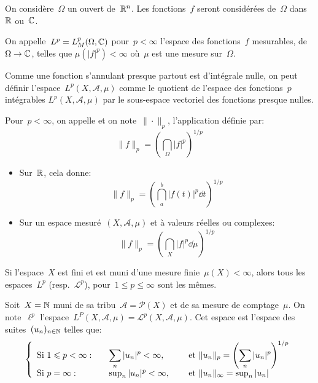 On considère~$\Omega$ un ouvert de~$\mathbb R^n$.
Les fonctions~$f$ seront considérées de~$\Omega$ dans~$\mathbb R$ ou~$\mathbb C$.

\medskip
On appelle~$\colorblue L^p \colorblack= L^p_M(\Omega,\CC)$ pour~$p<\infty$ l'espace des fonctions~$f$ mesurables, de~$\Omega \rightarrow \mathbb C$, telles que $\mu(|f|^p)<\infty$ où~$\mu$ est une mesure sur~$\Omega$.

\medskip
Comme une fonction s'annulant presque partout est d'intégrale nulle, on peut définir l'espace~$L^p(X, \mathcal{A}, \mu)$ comme le quotient de l'espace des fonctions~$p$ intégrables $L^p(X, \mathcal{A}, \mu)$ par le sous-espace vectoriel des fonctions presque nulles.


\medskip
\begin{definition}[Norme~$L^p$]
Pour~$p<\infty$, on appelle  et on note~$\|\cdot\|_p$, l'application définie par:
\begin{equation}\|f\|_p=\left(\dint_\Omega |f|^p\right)^{1/p}
\end{equation}
\end{definition}
\begin{itemize}
\item Sur~$\mathbb R$, cela donne:
\begin{equation}\|f\|_p=\left(\dint_a^b |f(t)|^p\dd t\right)^{1/p}\end{equation}
\item Sur un espace mesuré~$(X, \mathcal{A}, \mu)$ et à valeurs réelles ou complexes:
\begin{equation}\|f\|_p=\left(\dint_X |f|^p\dd\mu\right)^{1/p}\end{equation}
\end{itemize}
\medskip
\begin{theoreme}
Si l'espace~$X$ est fini et est muni d'une mesure finie~$\mu(X)<\infty$, alors tous les espaces~$L^p$ (resp.~$\mathcal{L}^p$), pour~$1\le p\le \infty$ sont les mêmes.
\end{theoreme}

\begin{definition}
Soit~$X=\mathbb N$ muni de sa tribu~$\mathcal{A}=\mathcal{P}(X)$ et de sa mesure de comptage~$\mu$.
On note~$\ell^p$ l'espace~$L^P(X,\mathcal{A},\mu)=\mathcal{L}^p(X,\mathcal{A},\mu)$.
Cet espace est l'espace des suites~$(u_n)_{n\in\mathbb N}$ telles que:
\begin{equation}
\left\{
\begin{array}{lll}
\text{Si } 1\leqslant p<\infty: &\quad \displaystyle\sum_n |u_n|^p<\infty, &\quad \text{ et } \|u_n\|_p=\left(\displaystyle\sum_n|u_n|^p\right)^{1/p}\\
\text{Si } p=\infty: &\quad \sup_n |u_n|^p<\infty, &\quad \text{ et } \|u_n\|_\infty=\sup_n|u_n|
\end{array}
\right.
\end{equation}
\end{definition}

